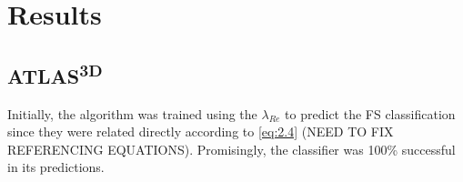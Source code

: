 \chapter{Results}

\label{ch:results}

\section{ATLAS\textsuperscript{3D}}
Initially, the algorithm was trained using the $\lambda_{Re}$ to predict the FS classification since they were related directly according to \cref{eq:2.4}
(NEED TO FIX REFERENCING EQUATIONS). Promisingly, the classifier was 100\% successful in its predictions. 